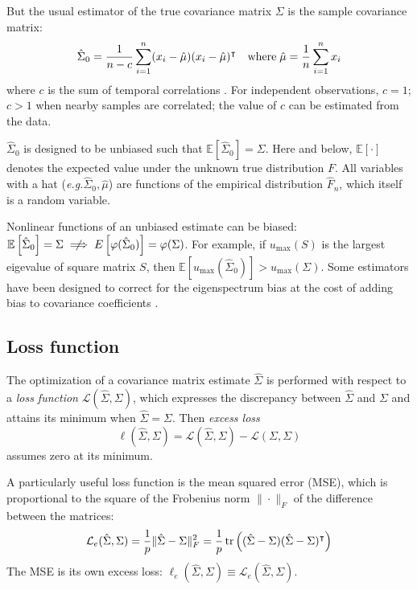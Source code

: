 But the usual estimator of the true covariance matrix $\Sigma$ is  the sample covariance matrix:
\begin{equation}
\hat\Sigma_0 =  \frac 1 {n-c} \sum\limits_{i=1}^n (x_i -\hat\mu) (x_i - \hat\mu)^\intercal
\quad\mbox{where}\;
\hat\mu = \frac 1 n \sum\limits_{i=1}^n x_i
\end{equation}
where $c$ is the sum of temporal correlations . For independent observations, $c=1$;  $c>1$ when nearby samples are correlated; the value of $c$ can be estimated from the data.

$\hat\Sigma_0$ is designed to be unbiased such that $\mathbb E\left[\hat\Sigma_0\right]=\Sigma$.
Here and below, $\mathbb E[\cdot]$ denotes the expected value under the  unknown true distribution $F$. All variables with a hat (\emph{e.g.}\;$\hat \Sigma_0,\hat \mu$) are functions of the empirical distribution $\hat F_n$, which itself is a random variable.

Nonlinear functions of an unbiased estimate can be biased: $\mathbb E\left[\hat\Sigma_0\right]=\Sigma \centernot\implies  E\left[\varphi(\hat\Sigma_0)\right]=\varphi(\Sigma)$.  For example, if $u_{\max}(S)$ is the largest eigevalue of square matrix $S$, then $\mathbb E\left[u_{\max}(\hat\Sigma_0)\right] > u_{\max}(\Sigma)$. Some estimators have been designed to correct for the eigenspectrum bias at the cost of adding bias to covariance coefficients \citep{Ledoit:2004}.




\subsection{Loss function}
The optimization of a covariance matrix estimate $\hat\Sigma$ is performed with respect to a \emph{loss function} $\mathcal L(\hat\Sigma,\Sigma)$, which expresses the discrepancy  between $\hat\Sigma$ and $\Sigma$ and attains its minimum when $\hat\Sigma=\Sigma$.  
Then \emph{excess loss}  
\begin{equation}
\ell(\hat\Sigma,\Sigma) = \mathcal L(\hat\Sigma,\Sigma)-\mathcal L(\Sigma,\Sigma)
\end{equation}
assumes zero at its minimum.

A particularly useful loss function is the mean squared error (MSE), which is proportional to the square of the Frobenius  norm $\|\cdot\|_F$ of the difference between the matrices: 
\begin{equation}
\mathcal L_e(\hat\Sigma,\Sigma) =\frac 1 p \|\hat\Sigma-\Sigma\|_F^2 = \frac 1 p \operatorname{tr}\left((\hat \Sigma-\Sigma)(\hat\Sigma-\Sigma)^\intercal\right)
\end{equation}
The MSE is its own excess loss: $\ell_e(\hat\Sigma,\Sigma) \equiv \mathcal L_e(\hat\Sigma,\Sigma)$.

